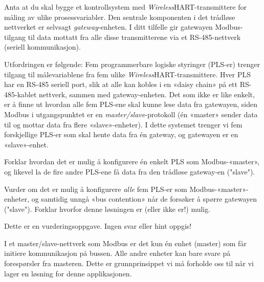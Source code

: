 
Anta at du skal bygge et kontrollsystem med {\sl Wireless}HART-transmittere for måling av ulike prosessvariabler. Den sentrale komponenten i det trådløse nettverket er selvsagt {\it gateway}-enheten. I ditt tilfelle gir gatewayen Modbus-tilgang til data mottatt fra alle disse transmitterene via et RS-485-nettverk (seriell kommunikasjon).

Utfordringen er følgende: Fem programmerbare logiske styringer (PLS-er) trenger tilgang til målevariablene fra fem ulike {\sl Wireless}HART-transmittere. Hver PLS har en RS-485 seriell port, slik at alle kan kobles i en «daisy chain» på ett RS-485-kablet nettverk, sammen med gateway-enheten. Det som ikke er like enkelt, er å finne ut hvordan alle fem PLS-ene skal kunne lese data fra gatewayen, siden Modbus i utgangspunktet er en {\it master/slave}-protokoll (én «master» sender data til og mottar data fra flere «slave»-enheter). I dette systemet trenger vi fem forskjellige PLS-er som skal hente data fra én gateway, og gatewayen er en «slave»-enhet.

\vskip 30pt

Forklar hvordan det er mulig å konfigurere én enkelt PLS som Modbus-«master», og likevel la de fire andre PLS-ene få data fra den trådløse gateway-en ("slave").

\vskip 100pt

Vurder om det er mulig å konfigurere {\it alle} fem PLS-er som Modbus-«master»-enheter, og samtidig unngå «bus contention» når de forsøker å spørre gatewayen ("slave"). Forklar hvorfor denne løsningen er (eller ikke er!) mulig.

\vfil

\eject






Dette er en vurderingsoppgave. Ingen svar eller hint oppgis!







I et master/slave-nettverk som Modbus er det kun én enhet (master) som får initiere kommunikasjon på bussen. Alle andre enheter kan bare svare på forespørsler fra masteren. Dette er grunnprinsippet vi må forholde oss til når vi lager en løsning for denne applikasjonen.

